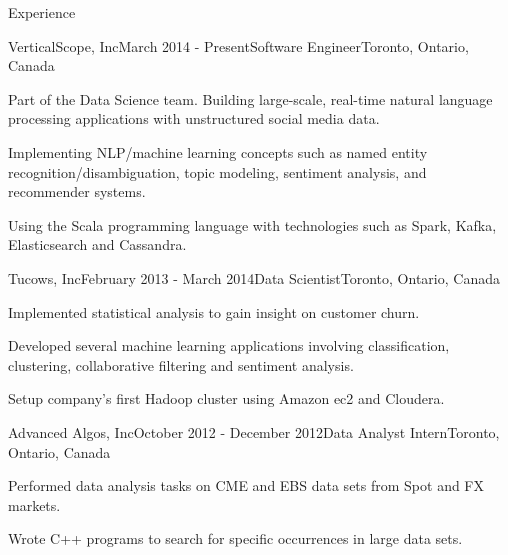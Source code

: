 \documentclass{resume}
\begin{document}
\begin{rSection}{Experience}

\begin{rSubsection}{VerticalScope, Inc}{March 2014 - Present}{Software Engineer}{Toronto, Ontario, Canada}
\item Part of the Data Science team. Building large-scale, real-time natural language processing applications with unstructured social media data.
\item Implementing NLP/machine learning concepts such as named entity recognition/disambiguation, topic modeling, sentiment analysis, and recommender systems.
\item Using the Scala programming language with technologies such as Spark, Kafka, Elasticsearch and Cassandra.
\end{rSubsection}


\begin{rSubsection}{Tucows, Inc}{February 2013 - March 2014}{Data Scientist}{Toronto, Ontario, Canada}
\item Implemented statistical analysis to gain insight on customer churn.
\item Developed several machine learning applications involving classification, clustering, collaborative filtering and sentiment analysis.
\item Setup company's first Hadoop cluster using Amazon ec2 and Cloudera.
\end{rSubsection}


\begin{rSubsection}{Advanced Algos, Inc}{October 2012 - December 2012}{Data Analyst Intern}{Toronto, Ontario, Canada}
\item Performed data analysis tasks on CME and EBS data sets from Spot and FX markets.
\item Wrote C++ programs to search for specific occurrences in large data sets.

\end{rSubsection}




\end{rSection}

\newpage
\end{document}

